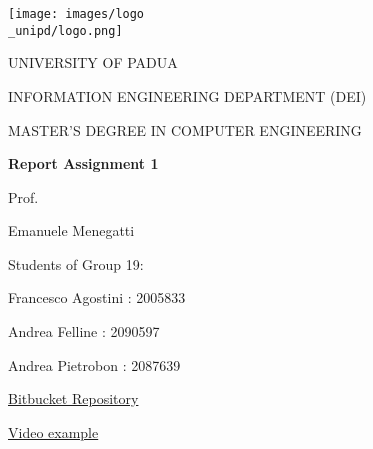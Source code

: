 \begin{titlepage}
    \begin{center}
        \texttt{[image: images/logo\\\_unipd/logo.png]}
        
        \vspace*{1cm}
        \Large
        \textmd{UNIVERSITY OF PADUA}
        
        \vspace*{1cm}
        \large
        \textmd{INFORMATION ENGINEERING DEPARTMENT (DEI)}
                
        \vspace*{0.5cm}
        \large
        \textmd{MASTER'S DEGREE IN COMPUTER ENGINEERING} 
                
        \vspace*{1cm}
        \Huge
        \textbf{Report Assignment 1}
        
        
        \raggedright
        \vspace*{1cm}
        \large
        \textmd{Prof.}
        
        \textmd{Emanuele Menegatti}
        
        \raggedleft
        \vspace*{0.5cm}
        \large
        \textmd{Students of Group 19:}
                
        \textmd{Francesco Agostini : 2005833}       
        
        \textmd{Andrea Felline : 2090597}        
        
        \textmd{Andrea Pietrobon : 2087639}
        
        \raggedright
        \vspace*{2cm}
        \large
        \textmd{\href{https://bitbucket.org/unipd-projects/ir2324_group_19/}{Bitbucket Repository}}
        
        \textmd{\href{https://drive.google.com/file/d/1OVGCOG_-ivf0-LZL4KkG6C-o00eFIXfU/view?usp=sharing}{Video example}}


        
    \end{center}
\end{titlepage}